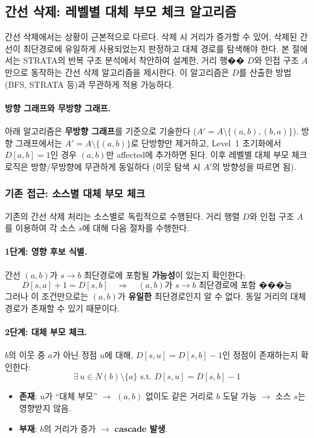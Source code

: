 \documentclass[11pt,a4paper]{article}
\begin{document}
\subsection{간선 삭제: 레벨별 대체 부모 체크 알고리즘}

간선 삭제에서는 상황이 근본적으로 다르다. 삭제 시 거리가 증가할 수 있어, 삭제된 간선이 최단경로에 유일하게 사용되었는지 판정하고 대체 경로를 탐색해야 한다. 본 절에서는 STRATA의 반복 구조 분석에서 착안하여 설계한, 거리 행�� $D$와 인접 구조 $A$만으로 동작하는 간선 삭제 알고리즘을 제시한다. 이 알고리즘은 $D$를 산출한 방법(BFS, STRATA 등)과 무관하게 적용 가능하다.

\paragraph{방향 그래프와 무방향 그래프.}
아래 알고리즘은 \textbf{무방향 그래프}를 기준으로 기술한다 ($A' = A \setminus \{(a,b),(b,a)\}$). 방향 그래프에서는 $A' = A \setminus \{(a,b)\}$로 단방향만 제거하고, Level~1 초기화에서 $D[a,b]=1$인 경우 $(a,b)$만 affected에 추가하면 된다. 이후 레벨별 대체 부모 체크 로직은 방향/무방향에 무관하게 동일하다 (이웃 탐색 시 $A'$의 방향성을 따르면 됨).

\subsubsection{기존 접근: 소스별 대체 부모 체크}

기존의 간선 삭제 처리는 소스별로 독립적으로 수행된다. 거리 행렬 $D$와 인접 구조 $A$를 이용하여 각 소스 $s$에 대해 다음 절차를 수행한다.

\paragraph{1단계: 영향 후보 식별.}
간선 $(a,b)$가 $s \to b$ 최단경로에 포함될 \textbf{가능성}이 있는지 확인한다:
\[
D[s,a] + 1 = D[s,b] \quad \Rightarrow \quad \text{$(a,b)$가 $s \to b$ 최단경로에 포함 ���능}
\]
그러나 이 조건만으로는 $(a,b)$가 \textbf{유일한} 최단경로인지 알 수 없다. 동일 거리의 대체 경로가 존재할 수 있기 때문이다.

\paragraph{2단계: 대체 부모 체크.}
$b$의 이웃 중 $a$가 아닌 정점 $u$에 대해, $D[s,u] = D[s,b]-1$인 정점이 존재하는지 확인한다:
\[
\exists\ u \in N(b) \setminus \{a\} \text{ s.t. } D[s,u] = D[s,b] - 1
\]
\begin{itemize}[leftmargin=1.4em]
  \item \textbf{존재}: $u$가 ``대체 부모'' $\to$ $(a,b)$ 없이도 같은 거리로 $b$ 도달 가능 $\to$ 소스 $s$는 영향받지 않음.
  \item \textbf{부재}: $b$의 거리가 증가 $\to$ \textbf{cascade 발생}.
\end{itemize}
\end{document}
